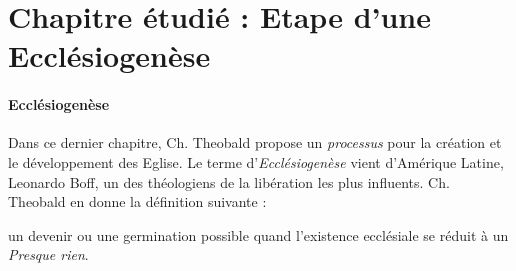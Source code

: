 \begin{comment}
    \begin{itemize}
    \item Une chute statistique des catholiques en France \textbf{}
    \item une Eglise en \textit{crise}, mais crise à qualifier : échec, propnléme de fonctionnement, maturation sans remettre présuppositions ? 
    \begin{itemize}
        \item Optimiste, le rapport Dagens : derrière la crise, un laboratoire
        \item plus pessimiste, Danièle Hervieu-Léger adopte la thèse de l'exculturation du catholicisme (à la différence de l'inculturation vue avec le texte d'Arrupe). \cite[p. 28{theobald_urgences_2017}
    \end{itemize}
\end{itemize}


 

\paragraph{Quelle réforme face à  l'affaiblissement de l'Eglise} 


\end{comment}
 
 


 
 
 




\section{Chapitre étudié : Etape d'une Ecclésiogenèse}

\paragraph{Ecclésiogenèse}
Dans ce dernier chapitre, Ch. Theobald propose un \textit{processus} pour la création et le développement des Eglise. 
Le terme d'\textit{Ecclésiogenèse} vient d'Amérique Latine, Leonardo Boff, un des théologiens de la libération les plus influents. Ch. Theobald en donne la définition suivante : 
\begin{singlequote}
    un devenir ou une germination possible quand l'existence ecclésiale se réduit à un \textit{Presque rien}.
\end{singlequote}


